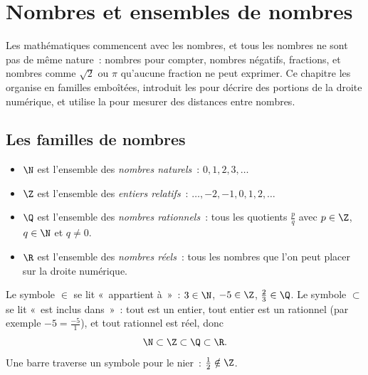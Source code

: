 \chapter{Nombres et ensembles de nombres}\label{ch:g10:numbers}

Les mathématiques commencent avec les nombres, et tous les nombres ne
sont pas de même nature~: nombres pour compter, nombres négatifs,
fractions, et nombres comme $\sqrt 2$ ou $\pi$ qu'aucune fraction ne
peut exprimer. Ce chapitre les organise en familles emboîtées,
introduit les  pour décrire des portions de la droite
numérique, et utilise la  pour mesurer des distances
entre nombres.

\section{Les familles de nombres}

\begin{definition}\label{def:g10:numbers:sets}
\begin{itemize}
  \item $\N$ est l'ensemble des \emph{nombres
        naturels}~: $0, 1, 2, 3, \dots$
  \item $\Z$ est l'ensemble des \emph{entiers
        relatifs}~: $\dots, -2, -1, 0, 1, 2,
        \dots$
  \item $\Q$ est l'ensemble des \emph{nombres
        rationnels}~: tous les quotients
        $\frac{p}{q}$ avec $p \in \Z$, $q \in \N$ et $q \neq 0$.
  \item $\R$ est l'ensemble des \emph{nombres
        réels}~: tous les nombres que l'on peut
        placer sur la droite numérique.
\end{itemize}
\end{definition}

\begin{notation}
Le symbole $\in$ se lit «~appartient à~»~: $3 \in \N$, $-5 \in \Z$,
$\frac23 \in \Q$. Le symbole $\subset$ se lit «~est inclus dans~»~:
tout  est un entier, tout entier est un rationnel
(par exemple $-5 = \frac{-5}{1}$), et tout rationnel est réel, donc
\[
\N \subset \Z \subset \Q \subset \R .
\]
Une barre traverse un symbole pour le nier~: $\frac12 \notin \Z$.
\end{notation}

